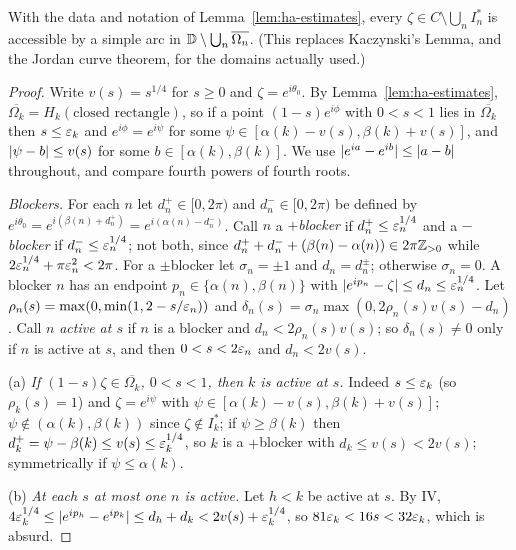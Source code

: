 \begin{lemma}\label{lem:ha-access}
With the data and notation of Lemma~\ref{lem:ha-estimates}, every $\zeta\in C\setminus\bigcup_nI_n^*$ is accessible by a simple arc
in $\mathbb{D}\setminus\bigcup_n\overline{\Omega_n}$. (This replaces Kaczynski's Lemma, and the Jordan curve theorem, for the domains
actually used.)
\end{lemma}
\begin{proof}
Write $v(s)=s^{1/4}$ for $s\ge0$ and $\zeta=e^{i\theta_0}$. By Lemma~\ref{lem:ha-estimates}, $\overline{\Omega_k}=H_k(\text{closed
rectangle})$, so if a point $(1-s)e^{i\phi}$ with $0<s<1$ lies in $\overline{\Omega_k}$ then $s\le\varepsilon_k$ and $e^{i\phi}=e^{i\psi}$ for some
$\psi\in[\alpha(k)-v(s),\beta(k)+v(s)]$, and $\lvert \psi-b\rvert\le v(s)$ for some $b\in[\alpha(k),\beta(k)]$. We use
$\lvert e^{ia}-e^{ib}\rvert\le\lvert a-b\rvert$ throughout, and compare fourth powers of fourth roots.

\emph{Blockers.} For each $n$ let $d^+_n\in[0,2\pi)$ and $d^-_n\in[0,2\pi)$ be defined by $e^{i\theta_0}=e^{i(\beta(n)+d^+_n)}=e^{i(\alpha(n)-d^-_n)}$.
Call $n$ a \emph{$+$blocker} if $d^+_n\le\varepsilon_n^{1/4}$ and a \emph{$-$blocker} if $d^-_n\le\varepsilon_n^{1/4}$; not both, since
$d^+_n+d^-_n+(\beta(n)-\alpha(n))\in2\pi\mathbb{Z}_{>0}$ while $2\varepsilon_n^{1/4}+\pi\varepsilon_n^2<2\pi$. For a $\pm$blocker let $\sigma_n=\pm1$ and
$d_n=d^\pm_n$; otherwise $\sigma_n=0$. A blocker $n$ has an endpoint $p_n\in\{\alpha(n),\beta(n)\}$ with $\lvert e^{ip_n}-\zeta\rvert\le d_n\le\varepsilon_n^{1/4}$.
Let $\rho_n(s)=\max(0,\min(1,2-s/\varepsilon_n))$ and $\delta_n(s)=\sigma_n\max(0,2\rho_n(s)v(s)-d_n)$. Call $n$ \emph{active at $s$} if $n$ is a
blocker and $d_n<2\rho_n(s)v(s)$; so $\delta_n(s)\ne0$ only if $n$ is active at $s$, and then $0<s<2\varepsilon_n$ and $d_n<2v(s)$.

(a) \emph{If $(1-s)\zeta\in\overline{\Omega_k}$, $0<s<1$, then $k$ is active at $s$.} Indeed $s\le\varepsilon_k$ (so $\rho_k(s)=1$) and
$\zeta=e^{i\psi}$ with $\psi\in[\alpha(k)-v(s),\beta(k)+v(s)]$; $\psi\notin(\alpha(k),\beta(k))$ since $\zeta\notin I_k^*$; if $\psi\ge\beta(k)$ then
$d^+_k=\psi-\beta(k)\le v(s)\le\varepsilon_k^{1/4}$, so $k$ is a $+$blocker with $d_k\le v(s)<2v(s)$; symmetrically if $\psi\le\alpha(k)$.

(b) \emph{At each $s$ at most one $n$ is active.} Let $h<k$ be active at $s$. By IV,
$4\varepsilon_k^{1/4}\le\lvert e^{ip_h}-e^{ip_k}\rvert\le d_h+d_k<2v(s)+\varepsilon_k^{1/4}$, so $81\varepsilon_k<16s<32\varepsilon_k$, which is absurd.


\end{proof}
